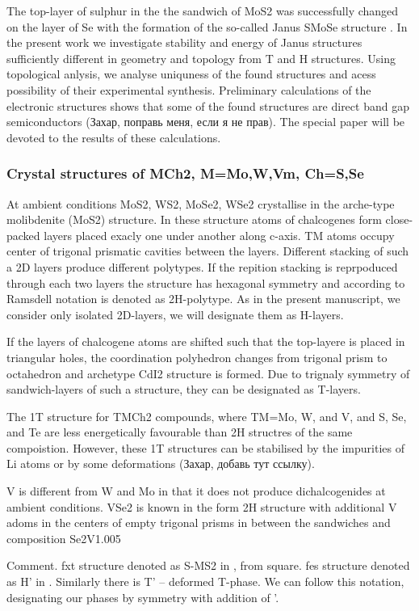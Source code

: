 \documentclass[a4paperm]{article}
\begin{document}
The top-layer of sulphur in the the sandwich of MoS2 was successfully changed on the layer of Se with the formation of the so-called Janus SMoSe structure  \cite{lu2017}.
In the present work we investigate stability and energy of Janus structures sufficiently different in geometry and topology from T and H structures.
Using topological anlysis, we analyse uniquness of the found structures and acess possibility of their experimental synthesis.
Preliminary calculations of the electronic structures shows that some of the found structures are direct band gap semiconductors (Захар, поправь меня, если я не прав).
The special paper will be devoted to the results of these calculations.


\subsubsection*{Crystal structures of MCh2, M=Mo,W,Vm, Ch=S,Se}
At ambient conditions MoS2, WS2, MoSe2, WSe2 crystallise in the arche-type molibdenite (MoS2) structure.
In these structure atoms of chalcogenes form close-packed layers placed exacly one under another along c-axis.
TM atoms occupy center of trigonal prismatic cavities between the layers.
Different stacking of such a 2D layers produce different polytypes.
If the repition stacking is reprpoduced through each two layers the structure has hexagonal symmetry and according to Ramsdell notation is denoted as 2H-polytype. 
As in the present manuscript, we consider only isolated 2D-layers, we will designate them as H-layers.

If the layers of chalcogene atoms are shifted such that the top-layere is placed in triangular holes, the coordination polyhedron changes from trigonal prism to octahedron and archetype CdI2 structure is formed. 
Due to trignaly symmetry of sandwich-layers of such a structure, they can be designated as T-layers.

The 1T structure for TMCh2 compounds, where TM=Mo, W, and V, and S, Se, and Te are less energetically favourable than 2H structres of the same compoistion.
However, these 1T structures can be stabilised by the impurities of Li atoms or by some deformations (Захар, добавь тут ссылку).

V is different from W and Mo in that it does not produce dichalcogenides at ambient conditions.
VSe2 is known in the form 2H structure with additional V adoms in the centers of empty trigonal prisms in between the sandwiches and composition Se2V1.005

Comment. 
fxt structure denoted as S-MS2 in \cite{tang2021_smose}, from square.
fes structure denoted as H' in \cite{ma2016_h'}.
Similarly there is T' – deformed T-phase.
We can follow this notation, designating our phases by symmetry with addition of '.
\end{document}

